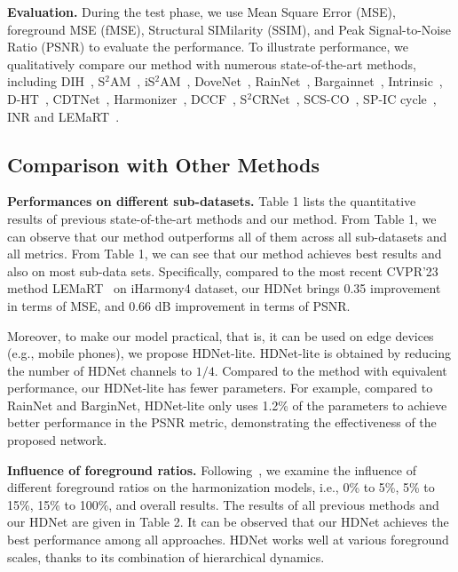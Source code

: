 \documentclass[sigconf]{acmart}
\begin{document}
\noindent
\textbf{Evaluation.} During the test phase, we use Mean Square Error (MSE), foreground MSE (fMSE), Structural SIMilarity (SSIM), and Peak Signal-to-Noise Ratio (PSNR) to evaluate the performance. To illustrate performance, we qualitatively compare our method with numerous state-of-the-art methods, including DIH~\cite{DIH}, S$^{2}$AM~\cite{SSAM}, iS$^{2}$AM~\cite{sofiiuk2021foreground}, DoveNet~\cite{DoveNet}, RainNet~\cite{RAIN}, Bargainnet~\cite{Bargainnet}, Intrinsic~\cite{GuoZJGZ21}, D-HT~\cite{IHT}, CDTNet~\cite{CDTNet}, Harmonizer~\cite{Harmonizer}, DCCF~\cite{DCCF}, S$^{2}$CRNet~\cite{liang2021spatial}, SCS-CO~\cite{hang2022scs}, SP-IC cycle~\cite{cai2023structure}, INR\cite{inr} and LEMaRT~\cite{liu2023lemart}. 

\subsection{Comparison with Other Methods}



\noindent
\textbf{Performances on different sub-datasets.} Table 1 lists the quantitative results of previous state-of-the-art methods and our method. From Table 1, we can observe that our method outperforms all of them across all sub-datasets and all metrics. From Table 1, we can see that our method achieves best results and also on most sub-data sets. Specifically, compared to the most recent CVPR'23 method LEMaRT~\cite{liu2023lemart} on iHarmony4 dataset, our HDNet brings 0.35 improvement in terms of MSE, and 0.66 dB improvement in terms of PSNR. 

Moreover, to make our model practical, that is, it can be used on edge devices (e.g., mobile phones), we propose HDNet-lite. HDNet-lite is obtained by reducing the number of HDNet channels to $1/4$. Compared to the method with equivalent performance, our HDNet-lite has fewer parameters. For example, compared to RainNet and BarginNet, HDNet-lite only uses 1.2\% of the parameters to achieve better performance in the PSNR metric, demonstrating the effectiveness of the proposed network.

\noindent
\textbf{Influence of foreground ratios.} Following~\cite{RAIN}, we examine the influence of different foreground ratios on the harmonization models, i.e., 0\% to 5\%, 5\% to 15\%, 15\% to 100\%, and overall results. The results of all previous methods and our HDNet are given in Table 2. It can be observed that our HDNet achieves the best performance among all approaches. HDNet works well at various foreground scales, thanks to its combination of hierarchical dynamics.
\end{document}
